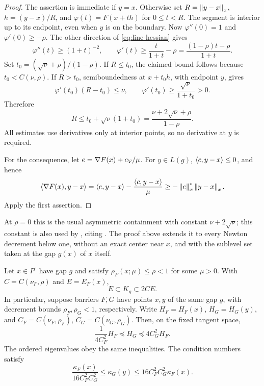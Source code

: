 \begin{proof}
The assertion is immediate if $y=x$. Otherwise set
$R=\left\lVert y-x\right\rVert_x$, $h=(y-x)/R$, and $\varphi(t)=F(x+th)$
for $0\leq t<R$. The segment is interior up to its endpoint, even when
$y$ is on the boundary. Now $\varphi''(0)=1$ and
$\varphi'(0)\geq-\rho$. The other direction of
\eqref{eq:line-hessian} gives
\begin{equation}
 \varphi''(t)\geq(1+t)^{-2},\qquad
 \varphi'(t)\geq\frac{t}{1+t}-\rho
             =\frac{(1-\rho)t-\rho}{1+t}.
 \label{eq:line-gradient-lower}
\end{equation}
Set $t_0=(\sqrt\nu+\rho)/(1-\rho)$. If $R\leq t_0$, the claimed
bound follows because $t_0<C(\nu,\rho)$. If $R>t_0$, semiboundedness
at $x+t_0h$, with endpoint $y$, gives
\[
 \varphi'(t_0)(R-t_0)\leq\nu,
 \qquad \varphi'(t_0)\geq\frac{\sqrt\nu}{1+t_0}>0.
\]
Therefore
\[
 R\leq t_0+\sqrt\nu(1+t_0)
   =\frac{\nu+2\sqrt\nu+\rho}{1-\rho}.
\]
All estimates use derivatives only at interior points, so no derivative
at $y$ is required.

For the consequence, let $e=\nabla F(x)+c_{\mathcal V}/\mu$. For $y\in L(g)$,
$\left\langle c,y-x\right\rangle\leq0$, and hence
\[
 \left\langle \nabla F(x),y-x\right\rangle
 =\left\langle e,y-x\right\rangle-\frac{\left\langle c,y-x\right\rangle}{\mu}
 \geq-\left\lVert e\right\rVert_x^*\left\lVert y-x\right\rVert_x.
\]
Apply the first assertion.
\end{proof}

At $\rho=0$ this is the usual asymmetric containment with constant
$\nu+2\sqrt\nu$; this constant is also used by
\citet[Fact 5.2]{xiongfreund2024}, citing
\citet[Theorem 5.3.8]{nesterov2018}. The proof above extends it to
every Newton decrement below one, without an exact center near $x$, and with
the sublevel set taken at the gap $g(x)$ of $x$ itself.

\begin{theorem}
\label{thm:difference-body}
Let $x\in P^\circ$ have gap $g$ and satisfy
$\rho_F(x;\mu)\leq\rho<1$ for some $\mu>0$. With
$C=C(\nu_F,\rho)$ and $E=E_F(x)$,
\begin{equation}
 E\subset K_g\subset2C E.
 \label{eq:difference-body-sandwich}
\end{equation}
In particular, suppose barriers $F,G$ have points $x,y$ of the same gap
$g$, with decrement bounds $\rho_F,\rho_G<1$, respectively. Write
$H_F=H_F(x)$, $H_G=H_G(y)$, and
$C_F=C(\nu_F,\rho_F)$, $C_G=C(\nu_G,\rho_G)$. Then, on the fixed
tangent space,
\begin{equation}
 \frac{1}{4C_F^2}H_F\preceq H_G\preceq4C_G^2 H_F.
 \label{eq:equal-gap-loewner}
\end{equation}
The ordered eigenvalues obey the same inequalities. The condition
numbers satisfy
\begin{equation}
 \frac{\kappa_F(x)}{16C_F^2C_G^2}
 \leq\kappa_G(y)\leq16C_F^2C_G^2\kappa_F(x).
 \label{eq:equal-gap-kappa}
\end{equation}
\end{theorem}

